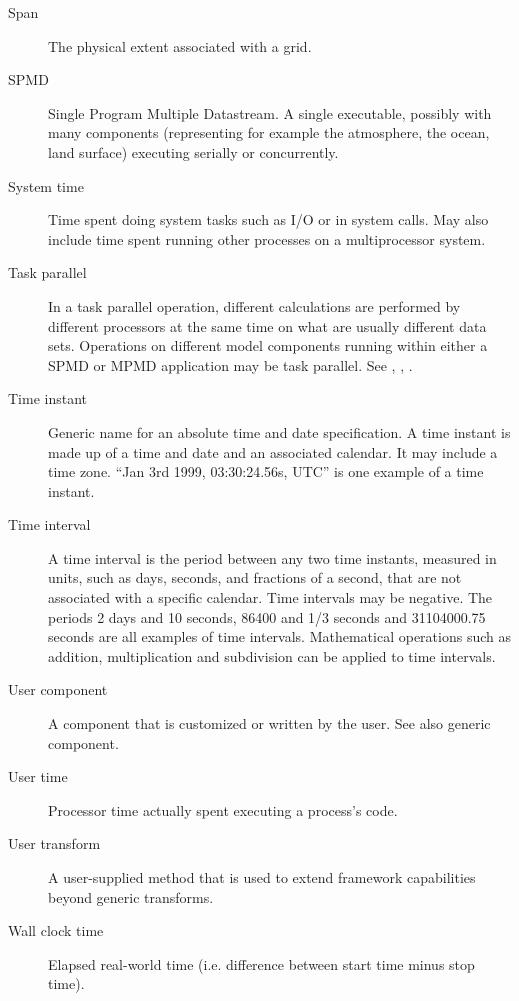\begin{description}
\item[Span] \label{glos:Span} The physical extent associated with a grid.

\item[SPMD] \label{glos:SPMD} Single Program Multiple Datastream. 
  A single executable, possibly with many 
  components (representing for example the atmosphere, the ocean, 
  land surface) executing serially or concurrently.

\item [System time] \label{glos:SysTime}Time spent doing system tasks such as I/O or in system calls.  May also
include time spent running other processes on a multiprocessor system.

\item[Task parallel] \label{glos:TaskParallel}  In a task parallel operation,
different calculations are performed by different processors at the same time
on what are usually different data sets.  Operations on different model 
components running within either a SPMD or MPMD application may be task 
parallel.  See , 
, .

\item [Time instant] \label{glos:TimeInstant}
Generic name for an absolute time and date specification. A time instant is made 
up of a time and date and an associated calendar. It may include a time zone.
``Jan 3rd 1999, 03:30:24.56s, UTC'' is one example of a time instant.

\item [Time interval] \label{glos:TimeInterval} A time interval is the
period between any two time instants, measured in units, such as days, 
seconds, and fractions of a second, that are not associated with a specific
calendar.  Time intervals may be negative.  The periods 2 days and 10 seconds, 
86400 and 1/3 seconds and 31104000.75 seconds are all examples of time intervals.  
Mathematical operations such as addition, multiplication and subdivision 
can be applied to time intervals.

\item [User component] \label{UserComp} A component that is customized or
written by the user.  See also generic component.

\item [User time] \label{UserTime} Processor time actually spent executing a process's code.

\item[User transform] \label{glos:UserTrans} A user-supplied 
  method that is used to extend framework capabilities beyond generic 
  transforms.  

\item [Wall clock time] \label{WallClockTime} Elapsed real-world time (i.e. difference between start time minus
stop time).

\end{description}
